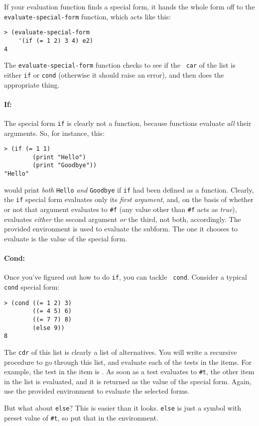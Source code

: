 \documentclass[letterpaper,12pt]{article}
\begin{document}
\begin{multicols}{2}
If your evaluation function finds a special form, it hands the whole
form off to the {\tt evaluate-special-form} function, which acts like
this:
\begin{Verbatim}
> (evaluate-special-form 
    '(if (= 1 2) 3 4) e2)
4  
\end{Verbatim}
The {\tt evaluate-special-form} function checks to see if the {\tt
  car} of the list is either {\tt if} or {\tt cond} (otherwise it
should raise an error), and then does the appropriate thing.

\paragraph{If:}
The special form {\tt if} is clearly not a function, because functions
evaluate {\em all} their arguments.  So, for instance, this:
\begin{Verbatim}
> (if (= 1 1) 
        (print "Hello") 
        (print "Goodbye"))
"Hello"
\end{Verbatim}
would print {\em both} {\tt Hello} {\em and} {\tt Goodbye} if {\tt if}
had been defined as a function.  Clearly, the {\tt if} special form
evaluates only its {\em first argument}, and, on the basis of whether
or not that argument evaluates to \verb|#f| (any value other than
\verb|#f| acts as {\em true}), evaluates {\em either} the second
argument {\em or} the third, not both, accordingly.
The provided environment is used to evaluate the subform.
The one it chooses to evaluate
is the value of the special form.

\paragraph{Cond:}
Once you've figured out how to do {\tt if}, you can tackle {\tt
  cond}.  Consider a typical {\tt cond} special form:
\begin{Verbatim}
> (cond ((= 1 2) 3) 
        ((= 4 5) 6) 
        ((= 7 7) 8) 
        (else 9))
8
\end{Verbatim}
The {\tt cdr} of this list is clearly a list of alternatives.  You
will write a recursive procedure to go through this list, and evaluate
each of the tests in the items.  For example, the test in the item
 is .  As soon as a test
evaluates to \verb|#t|, the other item in the list is evaluated, and
it is returned as the value of the special form.  Again, use the
provided environment to evaluate the selected forms.

But what about {\tt else}?  This is easier than it looks.  {\tt else}
is just a symbol with preset value of \verb|#t|, so put that in the
environment. 
  
\end{multicols}
\end{document}
